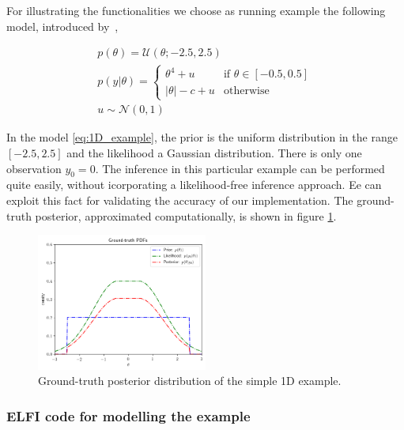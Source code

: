 For illustrating the functionalities we choose as running example the
following model, introduced by~\autocite{Ikonomov2019},

\begin{gather} \label{eq:1D_example} p(\theta) =
\mathcal{U}(\theta;-2.5,2.5)\\ p(y|\theta) = \left\{
    \begin{array}{ll} \theta^4 + u & \mbox{if } \theta \in [-0.5, 0.5]
\\ |\theta| - c + u & \mbox{otherwise}
    \end{array} \right.\\ u \sim \mathcal{N}(0,1)
\end{gather}

\noindent

In the model \eqref{eq:1D_example}, the prior is the uniform
distribution in the range $[-2.5, 2.5]$ and the likelihood a Gaussian
distribution. There is only one observation $y_0 = 0$. The inference
in this particular example can be performed quite easily, without
icorporating a likelihood-free inference approach. Ee can exploit this
fact for validating the accuracy of our implementation. The
ground-truth posterior, approximated computationally, is shown in
figure \ref{fig:example_gt}.

\begin{figure}[h]
    \begin{center}
\includegraphics[width=0.5\textwidth]{./Thesis/images/chapter3/example_gt.png}
    \end{center}
  \caption[Ground-truth posterior distribution of the simple 1D
example.]{Ground-truth posterior distribution of the simple 1D
example.}
  \label{fig:example_gt}
\end{figure}

\subsubsection*{ELFI code for modelling the example}

